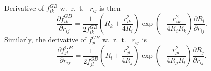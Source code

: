 \documentclass[12pt]{article}
\begin{document}
Derivative of $f_{ik}^{GB}$  w.~r.~t.~ $r_{ij}$ is then
\begin{equation}
\label{eq:fklGBderv2}
\frac{\partial f_{ik}^{GB}}{\partial r_{ij}} = \frac{1}{2f_{ik}^{GB}} \left( R_{k} + \frac{r_{ik}^{2}}{4R_{i}} \right) \exp\left(-\frac{r_{ik}^{2}}{4R_{i}R_{k}}\right)\frac{\partial R_{i}}{\partial r_{ij}}.
\end{equation}
Similarly, the derivative of $f_{jl}^{GB}$  w.~r.~t.~ $r_{ij}$ is
\begin{equation}
\label{eq:fklGBderv3}
\frac{\partial f_{jl}^{GB}}{\partial r_{ij}} = \frac{1}{2f_{jl}^{GB}} \left( R_{l} + \frac{r_{jl}^{2}}{4R_{j}} \right) \exp\left(-\frac{r_{jl}^{2}}{4R_{j}R_{l}}\right)\frac{\partial R_{j}}{\partial r_{ij}}.
\end{equation}
\end{document}
